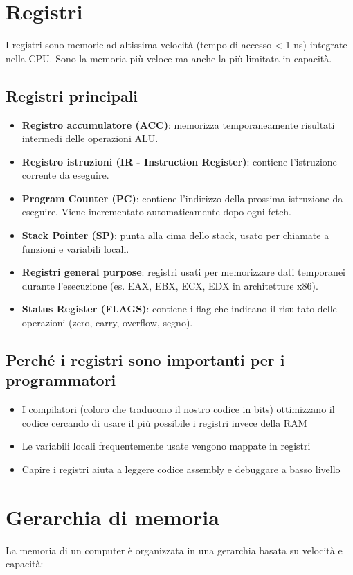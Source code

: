 \documentclass[12pt,a4paper]{article}
\begin{document}
\section{Registri}
I registri sono memorie ad altissima velocità (tempo di accesso < 1 ns) integrate nella CPU. Sono la memoria più veloce ma anche la più limitata in capacità.

\subsection{Registri principali}
\begin{itemize}
    \item \textbf{Registro accumulatore (ACC)}: memorizza temporaneamente risultati intermedi delle operazioni ALU.
    \item \textbf{Registro istruzioni (IR - Instruction Register)}: contiene l'istruzione corrente da eseguire.
    \item \textbf{Program Counter (PC)}: contiene l'indirizzo della prossima istruzione da eseguire. Viene incrementato automaticamente dopo ogni fetch.
    \item \textbf{Stack Pointer (SP)}: punta alla cima dello stack, usato per chiamate a funzioni e variabili locali.
    \item \textbf{Registri general purpose}: registri usati per memorizzare dati temporanei durante l'esecuzione (es. EAX, EBX, ECX, EDX in architetture x86).
    \item \textbf{Status Register (FLAGS)}: contiene i flag che indicano il risultato delle operazioni (zero, carry, overflow, segno).
\end{itemize}

\subsection{Perché i registri sono importanti per i programmatori}
\begin{itemize}
    \item I compilatori (coloro che traducono il nostro codice in bits) ottimizzano il codice cercando di usare il più possibile i registri invece della RAM
    \item Le variabili locali frequentemente usate vengono mappate in registri
    \item Capire i registri aiuta a leggere codice assembly e debuggare a basso livello
\end{itemize}

\section{Gerarchia di memoria}
La memoria di un computer è organizzata in una gerarchia basata su velocità e capacità:
\end{document}
